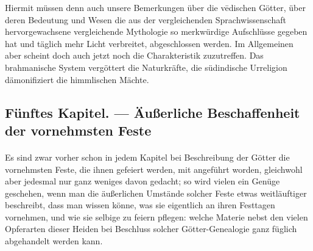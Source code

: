 \documentclass{article}
\begin{document}
Hiermit müssen denn auch unsere Bemerkungen über die v\={e}dischen Götter, über deren Bedeutung und Wesen die aus der vergleichenden Sprachwissenschaft hervorgewachsene vergleichende Mythologie so merkwürdige Aufschlüsse gegeben hat und täglich mehr Licht verbreitet, abgeschlossen werden. Im Allgemeinen aber scheint doch auch jetzt noch die Charakteristik zuzutreffen. Das brahmanische System vergöttert die Naturkräfte, die südindische Urreligion dämonifiziert die himmlischen Mächte.

\clearpage
\subsection{Fünftes Kapitel. — Äußerliche Beschaffenheit der vornehmsten Feste}
\paragraph{}
Es sind zwar vorher schon in jedem Kapitel bei Beschreibung der Götter die vornehmsten Feste, die ihnen gefeiert werden, mit angeführt worden, gleichwohl aber jedesmal nur ganz weniges davon gedacht; so wird vielen ein Genüge geschehen, wenn man die äußerlichen Umstände solcher Feste etwas weitläuftiger beschreibt, dass man wissen könne, was sie eigentlich an ihren Festtagen vornehmen, und wie sie selbige zu feiern pflegen: welche Materie nebst den vielen Opferarten dieser Heiden bei Beschluss solcher Götter-Genealogie ganz füglich abgehandelt werden kann.
\end{document}
